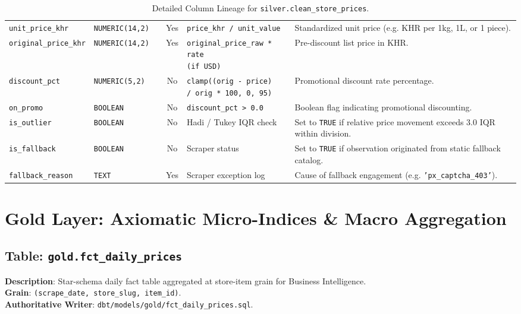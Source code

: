 \documentclass[a4paper, 11pt]{article}
\begin{document}
\begin{table}[H]
\begin{tabularx}{\textwidth}{l p{2.5cm} c c p{4.2cm} X}
\texttt{unit\_price\_khr} & \texttt{NUMERIC(14,2)} & & Yes & \texttt{price\_khr / unit\_value} & Standardized unit price (e.g. KHR per 1kg, 1L, or 1 piece). \\
\texttt{original\_price\_khr} & \texttt{NUMERIC(14,2)} & & Yes & \makecell[l]{\texttt{original\_price\_raw * rate}\\\texttt{(if USD)}} & Pre-discount list price in KHR. \\
\texttt{discount\_pct} & \texttt{NUMERIC(5,2)} & & No & \makecell[l]{\texttt{clamp((orig - price)}\\\texttt{/ orig * 100, 0, 95)}} & Promotional discount rate percentage. \\
\texttt{on\_promo} & \texttt{BOOLEAN} & & No & \texttt{discount\_pct > 0.0} & Boolean flag indicating promotional discounting. \\
\texttt{is\_outlier} & \texttt{BOOLEAN} & & No & Hadi / Tukey IQR check & Set to \texttt{TRUE} if relative price movement exceeds 3.0 IQR within division. \\
\texttt{is\_fallback} & \texttt{BOOLEAN} & & No & Scraper status & Set to \texttt{TRUE} if observation originated from static fallback catalog. \\
\texttt{fallback\_reason} & \texttt{TEXT} & & Yes & Scraper exception log & Cause of fallback engagement (e.g. \texttt{'px\_captcha\_403'}). \\
\bottomrule
\end{tabularx}
\caption{Detailed Column Lineage for \texttt{silver.clean\_store\_prices}.}
\end{table}

\section{Gold Layer: Axiomatic Micro-Indices \& Macro Aggregation}

\subsection{Table: \texttt{gold.fct\_daily\_prices}}
\textbf{Description}: Star-schema daily fact table aggregated at store-item grain for Business Intelligence. \\
\textbf{Grain}: \texttt{(scrape\_date, store\_slug, item\_id)}. \\
\textbf{Authoritative Writer}: \texttt{dbt/models/gold/fct\_daily\_prices.sql}.
\end{document}
